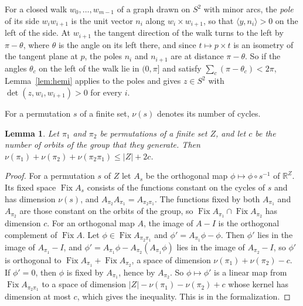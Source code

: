 \documentclass[12pt]{amsart}
\newtheorem{lemma}[theorem]{Lemma}
\theoremstyle{definition}
\theoremstyle{plain}
\theoremstyle{definition}
\newcommand{\R}{\mathbb{R}}
\newcommand{\Sph}{S^2}
\newcommand{\leanmap}[1]{\ignorespaces}
\newcommand{\mapnote}[1]{\ignorespaces}
\begin{document}
For a closed walk $w_0,\dots,w_{m-1}$ of a graph drawn on $\Sph$ with minor arcs, the \emph{pole} of its side $w_iw_{i+1}$ is the unit vector $n_i$ along $w_i\times w_{i+1}$, so that $\langle y,n_i\rangle>0$ on the left of the side. At $w_{i+1}$ the tangent direction of the walk turns to the left by $\pi-\theta$, where $\theta$ is the angle on its left there, and since $t\mapsto p\times t$ is an isometry of the tangent plane at $p$, the poles $n_i$ and $n_{i+1}$ are at distance $\pi-\theta$. So if the angles $\theta_c$ on the left of the walk lie in $(0,\pi]$ and satisfy $\sum_c(\pi-\theta_c)<2\pi$, Lemma~\ref{lem:hemi} applies to the poles and gives $z\in\Sph$ with $\det(z,w_i,w_{i+1})>0$ for every $i$.

For a permutation $s$ of a finite set, $\nu(s)$ denotes its number of cycles.

\begin{lemma}\label{lem:genus}\leanmap{Tammes15.permutation_cycle_bound_classes}\mapnote{with $c$ the number of classes of any partition of $Z$ such that every function invariant under $\pi_1$ and $\pi_2$ is constant on each class}
Let $\pi_1$ and $\pi_2$ be permutations of a finite set $Z$, and let $c$ be the number of orbits of the group that they generate. Then $\nu(\pi_1)+\nu(\pi_2)+\nu(\pi_2\pi_1)\le|Z|+2c$.
\end{lemma}

\begin{proof}
For a permutation $s$ of $Z$ let $A_s$ be the orthogonal map $\phi\mapsto \phi\circ s^{-1}$ of $\R^Z$. Its fixed space $\operatorname{Fix}A_s$ consists of the functions constant on the cycles of $s$ and has dimension $\nu(s)$, and $A_{\pi_2} A_{\pi_1}=A_{\pi_2\pi_1}$. The functions fixed by both $A_{\pi_1}$ and $A_{\pi_2}$ are those constant on the orbits of the group, so $\operatorname{Fix}A_{\pi_1}\cap\operatorname{Fix}A_{\pi_2}$ has dimension $c$. For an orthogonal map $A$, the image of $A-I$ is the orthogonal complement of $\operatorname{Fix}A$. Let $\phi\in\operatorname{Fix}A_{\pi_2\pi_1}$ and $\phi'=A_{\pi_1} \phi-\phi$. Then $\phi'$ lies in the image of $A_{\pi_1}-I$, and $\phi'=A_{\pi_1} \phi-A_{\pi_2}(A_{\pi_1} \phi)$ lies in the image of $A_{\pi_2}-I$, so $\phi'$ is orthogonal to $\operatorname{Fix}A_{\pi_1}+\operatorname{Fix}A_{\pi_2}$, a space of dimension $\nu(\pi_1)+\nu(\pi_2)-c$. If $\phi'=0$, then $\phi$ is fixed by $A_{\pi_1}$, hence by $A_{\pi_2}$. So $\phi\mapsto \phi'$ is a linear map from $\operatorname{Fix}A_{\pi_2\pi_1}$ to a space of dimension $|Z|-\nu(\pi_1)-\nu(\pi_2)+c$ whose kernel has dimension at most $c$, which gives the inequality. This is  in the formalization.
\end{proof}
\end{document}
